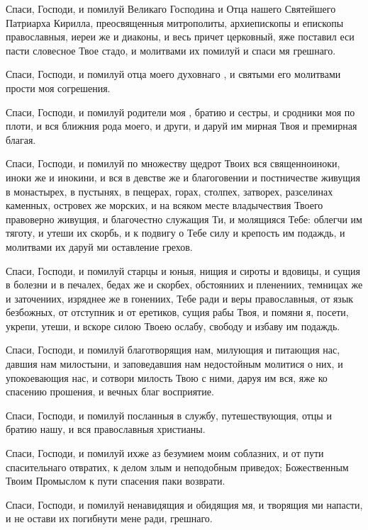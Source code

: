 \begin{mymulticols}
Спаси, Господи, и помилуй Великаго Господина и Отца нашего Святейшего Патриарха Кирилла, преосвященныя митрополиты, архиепископы и епископы православныя, иереи же и диаконы, и весь причет церковный, яже поставил еси пасти словесное Твое стадо, и молитвами их помилуй и спаси мя грешнаго. 

Спаси, Господи, и помилуй отца моего духовнаго , и святыми его молитвами прости моя согрешения. 

Спаси, Господи, и помилуй родители моя , братию и сестры, и сродники моя по плоти, и вся ближния рода моего, и други, и даруй им мирная Твоя и премирная благая. 

Спаси, Господи, и помилуй по множеству щедрот Твоих вся священноиноки, иноки же и инокини, и вся в девстве же и благоговении и постничестве живущия в монастырех, в пустынях, в пещерах, горах, столпех, затворех, разселинах каменных, островех же морских, и на всяком месте владычествия Твоего правоверно живущия, и благочестно служащия Ти, и молящияся Тебе: облегчи им тяготу, и утеши их скорбь, и к подвигу о Тебе силу и крепость им подаждь, и молитвами их даруй ми оставление грехов. 

Спаси, Господи, и помилуй старцы и юныя, нищия и сироты и вдовицы, и сущия в болезни и в печалех, бедах же и скорбех, обстояниих и пленениих, темницах же и заточениих, изряднее же в гонениих, Тебе ради и веры православныя, от язык безбожных, от отступник и от еретиков, сущия рабы Твоя, и помяни я, посети, укрепи, утеши, и вскоре силою Твоею ослабу, свободу и избаву им подаждь. 

Спаси, Господи, и помилуй благотворящия нам, милующия и питающия нас, давшия нам милостыни, и заповедавшия нам недостойным молитися о них, и упокоевающия нас, и сотвори милость Твою с ними, даруя им вся, яже ко спасению прошения, и вечных благ восприятие. 

Спаси, Господи, и помилуй посланныя в службу, путешествующия, отцы и братию нашу, и вся православныя христианы. 

Спаси, Господи, и помилуй ихже аз безумием моим соблазних, и от пути спасительнаго отвратих, к делом злым и неподобным приведох; Божественным Твоим Промыслом к пути спасения паки возврати. 

Спаси, Господи, и помилуй ненавидящия и обидящия мя, и творящия ми напасти, и не остави их погибнути мене ради, грешнаго. 


\end{mymulticols}

